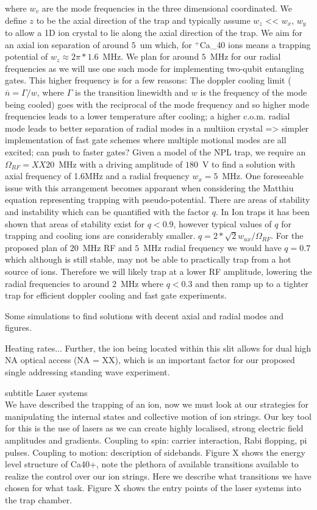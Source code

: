 \documentclass{article}
\begin{document}
where $w_v$ are the mode frequencies in the three dimensional
coordinated. We define $z$ to be the axial direction of the trap and
typically assume $w_z$ << $w_x$, $w_y$ to allow a 1D ion crystal to
lie along the axial direction of the trap. We aim for an axial ion
separation of around $5$~um which, for $^+$Ca_{40} ions means a
trapping potential of $w_z \approx 2\pi * 1.6$~MHz. We plan for around
$5$~MHz for our radial frequencies as we will use one such mode for
implementing two-qubit entangling gates. This higher frequency is for
a few reasons: The doppler cooling limit ($\overline{n} = \Gamma/w$,
where $\Gamma$ is the transition linewidth and $w$ is the
frequency of the mode being cooled) goes with the reciprocal of the
mode frequency and so higher mode frequencies leads to a lower
temperature after cooling; a higher c.o.m. radial mode leads to better
separation of radial modes in a multiion crystal => simpler
implementation of fast gate schemes where multiple motional modes are
all excited; can push to faster gates?  Given a model of the NPL trap,
we require an $\Omega_{RF} = XX20$~MHz with a driving amplitude of
$180$~V to find a solution with axial frequency of 1.6MHz and a radial
frequency $w_x = 5$~MHz.
One foreseeable issue with this arrangement becomes apparant when
considering the Matthiu equation representing trapping with
pseudo-potential. There are areas of stability and instability which
can be quantified with the factor $q$. In Ion traps it has been shown
that areas of stability exist for $q<0.9$, however typical values of
$q$ for trapping and cooling ions are considerably smaller.
$q = 2*\sqrt{2}w_{ax}/\Omega_{RF}$.
For the proposed plan of $20$~MHz RF and $5$~MHz radial frequency we
would have $q = 0.7$ which although is still stable, may not be able
to practically trap from a hot source of ions. Therefore we will
likely trap at a lower RF amplitude, lowering the radial frequencies
to around $2$~MHz where $q<0.3$ and then ramp up to a tighter trap for
efficient doppler cooling and fast gate experiments.

Some simulations to find solutions with decent axial and radial modes and figures.

Heating rates... Further, the ion being located within this
slit allows for dual high NA optical access (NA = XX), which is an
important factor for our proposed single addressing standing wave
experiment.

subtitle Laser systems\\

We have described the trapping of an ion, now we must look at our
strategies for manipulating the internal states and collective motion
of ion strings. Our key tool for this is the use of lasers as we can
create highly localised, strong electric field amplitudes and
gradients. Coupling to spin: carrier interaction, Rabi flopping, pi
pulses. Coupling to motion: description of sidebands.
Figure X shows the energy level structure of Ca40+, note the plethora
of available transitions available to realize the control over our ion
strings. Here we describe what transitions we have chosen for what
task.
Figure X shows the entry points of the laser systems into the trap
chamber.
\end{document}
